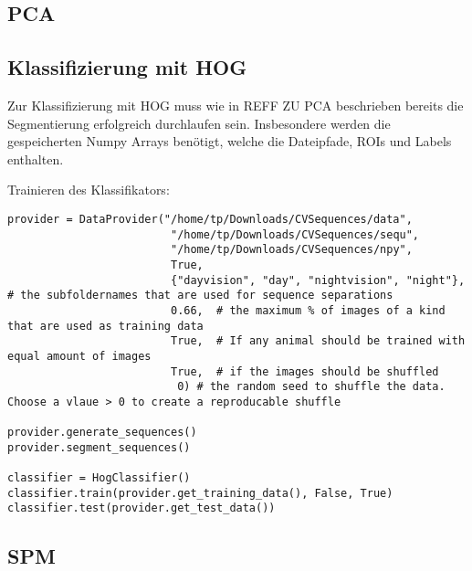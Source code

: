 \subsection*{PCA}
\subsection*{Klassifizierung mit HOG}
Zur Klassifizierung mit HOG muss wie in REFF ZU PCA beschrieben bereits die Segmentierung erfolgreich durchlaufen sein. Insbesondere werden die gespeicherten Numpy Arrays benötigt, welche die Dateipfade, ROIs und Labels enthalten.

Trainieren des Klassifikators:


\begin{lstlisting}
provider = DataProvider("/home/tp/Downloads/CVSequences/data",
                         "/home/tp/Downloads/CVSequences/sequ",
                         "/home/tp/Downloads/CVSequences/npy",
                         True,
                         {"dayvision", "day", "nightvision", "night"},  # the subfoldernames that are used for sequence separations
                         0.66,  # the maximum % of images of a kind that are used as training data
                         True,  # If any animal should be trained with equal amount of images
                         True,  # if the images should be shuffled
                          0) # the random seed to shuffle the data. Choose a vlaue > 0 to create a reproducable shuffle

provider.generate_sequences()
provider.segment_sequences()

classifier = HogClassifier()
classifier.train(provider.get_training_data(), False, True)
classifier.test(provider.get_test_data())
\end{lstlisting}



\subsection*{SPM}




